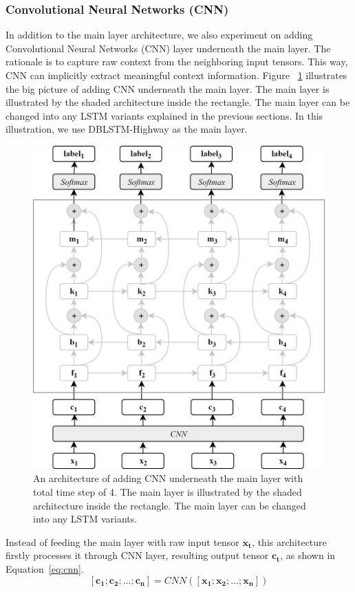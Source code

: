 \subsubsection{Convolutional Neural Networks (CNN)}
In addition to the main layer architecture, we also experiment on adding Convolutional Neural Networks (CNN) layer underneath the main layer. The rationale is to capture raw context from the neighboring input tensors. This way, CNN can implicitly extract meaningful context information. Figure ~\ref{fig:cnndblstmhighway} illustrates the big picture of adding CNN underneath the main layer. The main layer is illustrated by the shaded architecture inside the rectangle. The main layer can be changed into any LSTM variants explained in the previous sections. In this illustration, we use DBLSTM-Highway as the main layer.

\begin{figure}
	\centering
	\includegraphics[width=0.75\linewidth]{images/cnndblstmhighway}
	\caption{An architecture of adding CNN underneath the main layer with total time step of 4. The main layer is illustrated by the shaded architecture inside the rectangle. The main layer can be changed into any LSTM variants.}
	\label{fig:cnndblstmhighway}
\end{figure}

Instead of feeding the main layer with raw input tensor $\mathbf{x_{t}}$, this architecture firstly processes it through CNN layer, resulting output tensor $\mathbf{c_{t}}$, as shown in Equation~\ref{eq:cnn}.
\begin{equation}
\label{eq:cnn}
[\mathbf{c_{1}}; \mathbf{c_{2}}; ...; \mathbf{c_{n}}] = CNN([\mathbf{x_{1}}; \mathbf{x_{2}}; ...; \mathbf{x_{n}}])
\end{equation}

